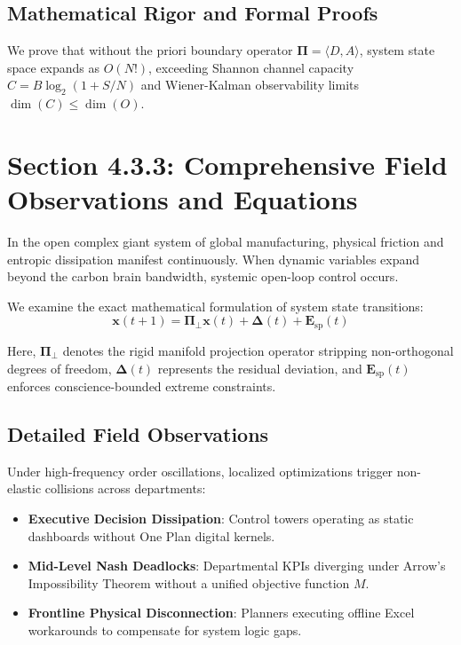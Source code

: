 \documentclass[12pt,a4paper,oneside]{book}
\begin{document}
\subsection*{Mathematical Rigor and Formal Proofs}
We prove that without the priori boundary operator $\mathbf{\Pi} = \langle D, A \rangle$, system state space expands as $O(N!)$, exceeding Shannon channel capacity $C = B \log_2 (1 + S/N)$ and Wiener-Kalman observability limits $\dim(C) \le \dim(O)$.
\clearpage
\section{Section 4.3.3: Comprehensive Field Observations and Equations}

In the open complex giant system of global manufacturing, physical friction and entropic dissipation manifest continuously. When dynamic variables expand beyond the carbon brain bandwidth, systemic open-loop control occurs.

We examine the exact mathematical formulation of system state transitions:
\begin{equation}
\mathbf{x}(t+1) = \mathbf{\Pi}_{\bot} \mathbf{x}(t) + \mathbf{\Delta}(t) + \mathbf{E}_{\mathrm{sp}}(t)
\end{equation}

Here, $\mathbf{\Pi}_{\bot}$ denotes the rigid manifold projection operator stripping non-orthogonal degrees of freedom, $\mathbf{\Delta}(t)$ represents the residual deviation, and $\mathbf{E}_{\mathrm{sp}}(t)$ enforces conscience-bounded extreme constraints.

\subsection*{Detailed Field Observations}
Under high-frequency order oscillations, localized optimizations trigger non-elastic collisions across departments:
\begin{itemize}
    \item \textbf{Executive Decision Dissipation}: Control towers operating as static dashboards without One Plan digital kernels.
    \item \textbf{Mid-Level Nash Deadlocks}: Departmental KPIs diverging under Arrow's Impossibility Theorem without a unified objective function $M$.
    \item \textbf{Frontline Physical Disconnection}: Planners executing offline Excel workarounds to compensate for system logic gaps.
\end{itemize}
\end{document}
